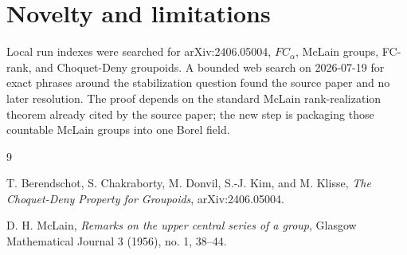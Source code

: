 \documentclass[11pt]{amsart}
\begin{document}
\section{Novelty and limitations}

Local run indexes were searched for arXiv:2406.05004, \(FC_\alpha\), McLain
groups, FC-rank, and Choquet-Deny groupoids.  A bounded web search on
2026-07-19 for exact phrases around the stabilization question found the
source paper and no later resolution.  The proof depends on the standard
McLain rank-realization theorem already cited by the source paper; the new
step is packaging those countable McLain groups into one Borel field.

\begin{thebibliography}{9}

T. Berendschot, S. Chakraborty, M. Donvil, S.-J. Kim, and M. Klisse,
\emph{The Choquet-Deny Property for Groupoids},
arXiv:2406.05004.

D. H. McLain,
\emph{Remarks on the upper central series of a group},
Glasgow Mathematical Journal 3 (1956), no. 1, 38--44.

\end{thebibliography}
\end{document}
